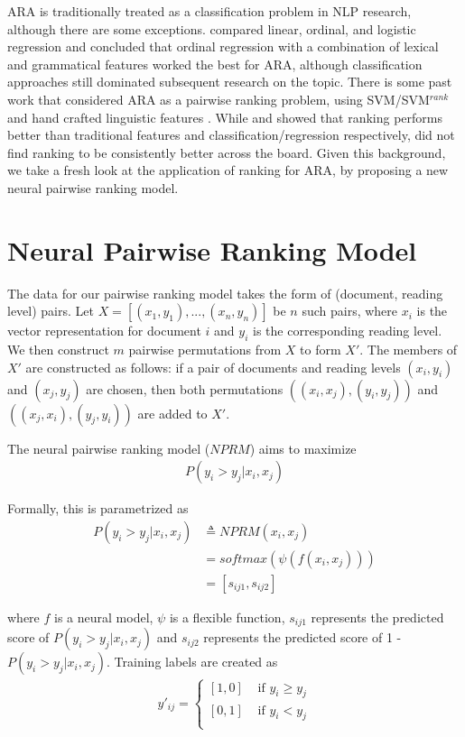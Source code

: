 \documentclass[11pt]{article}
\begin{document}
ARA is traditionally treated as a classification problem in NLP research, although there are some exceptions.  compared linear, ordinal, and logistic regression and concluded that ordinal regression with a combination of lexical and grammatical features worked the best for ARA, although classification approaches still dominated subsequent research on the topic. There is some past work that considered ARA as a pairwise ranking problem, using SVM/SVM$^{rank}$ and hand crafted linguistic features \cite{Pitler.Nenkova-08,Tanaka-Ishii.Tezuka.ea-10,Ma.Fosler-Lussier.ea-12,Mesgar.Strube-15,Ambati.Reddy.ea-16,Howcroft.Demberg-17}. While  and  showed that ranking performs better than traditional features and classification/regression respectively,  did not find ranking to be consistently better across the board. Given this background, we take a fresh look at the application of ranking for ARA, by proposing a new neural pairwise ranking model. 

\section{Neural Pairwise Ranking Model}
\label{sec:model}
The data for our pairwise ranking model takes the form of (document, reading level) pairs. Let $X = [(x_1, y_1),...,(x_n, y_n)]$ be $n$ such pairs, where $x_i$ is the vector representation for document $i$ and $y_i$ is the corresponding reading level. We then construct $m$ pairwise permutations from $X$ to form $X'$. The members of $X'$ are constructed as follows: if a pair of documents and reading levels $(x_i, y_i)$ and $(x_j, y_j)$ are chosen, then both permutations $((x_i, x_j), (y_i, y_j))$ and $((x_j, x_i), (y_j, y_i))$ are added to $X'$.  

The neural pairwise ranking model (\textit{$NPRM$}) aims to maximize
\begin{align*}
    P(y_i > y_j|x_i, x_j)
\end{align*}

Formally, this is parametrized as 
\begin{align*}
    P(y_i > y_j|x_i, x_j) & \triangleq NPRM(x_i, x_j)\\
    & = softmax(\psi(f(x_i, x_j))) \\
    & = [s_{ij1}, s_{ij2}]
\end{align*}

where $f$ is a neural model, $\psi$ is a flexible function, $s_{ij1}$ represents the predicted score of $P(y_i > y_j|x_i, x_j)$ and $s_{ij2}$ represents the predicted score of 1 - $P(y_i > y_j|x_i, x_j)$.  
Training labels are created as 
\begin{align*}
    y'_{ij} = \begin{cases} 
                [1, 0] & \text{ if } y_i\geq y_j \\
                [0, 1] & \text{ if } y_i < y_j  \\
            \end{cases}
\end{align*}
\end{document}
